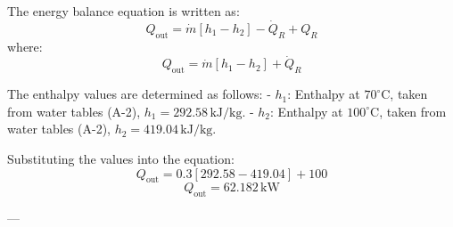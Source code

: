 The energy balance equation is written as:  
\[
Q_{\text{out}} = \dot{m} \left[ h_1 - h_2 \right] - \dot{Q}_R + Q_R
\]  
where:  
\[
Q_{\text{out}} = \dot{m} \left[ h_1 - h_2 \right] + \dot{Q}_R
\]  

The enthalpy values are determined as follows:  
- \( h_1 \): Enthalpy at \( 70^\circ \text{C} \), taken from water tables (A-2), \( h_1 = 292.58 \, \text{kJ/kg} \).  
- \( h_2 \): Enthalpy at \( 100^\circ \text{C} \), taken from water tables (A-2), \( h_2 = 419.04 \, \text{kJ/kg} \).  

Substituting the values into the equation:  
\[
Q_{\text{out}} = 0.3 \left[ 292.58 - 419.04 \right] + 100
\]  
\[
Q_{\text{out}} = 62.182 \, \text{kW}
\]  

---